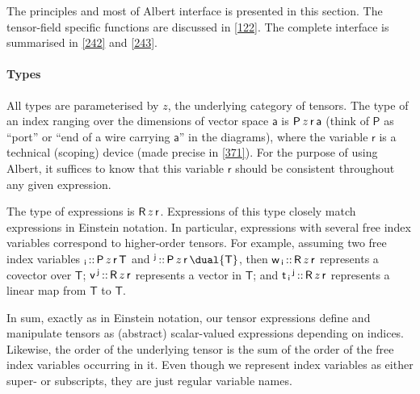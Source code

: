\documentclass[nolinenum]{jfp}
\begin{document}
The principles and most of {\sc{}Albert} interface is presented in this
section. The tensor-field specific functions are discussed in
\cref{122}. The complete interface is summarised in \cref{242} and \cref{243}.

\paragraph*{Types}\hspace{1.0ex}\label{106} All types are parameterised by \(z\), the underlying category of tensors.
The type of an index ranging over the dimensions of vector space
\(\mathsf{a}\) is \(\mathsf{P}\mskip 3.0muz\mskip 3.0mu\mathsf{r}\mskip 3.0mu\mathsf{a}\) (think of \(\mathsf{P}\) as ``port'' or ``end of a wire carrying \(\mathsf{a}\)'' in
the diagrams), where the variable \(\mathsf{r}\) is a technical (scoping) device
(made precise in \cref{371}). For the purpose of using {\sc{}Albert}, it
suffices to know that this variable \(\mathsf{r}\) should be consistent
throughout any given expression.

The type of expressions is \(\mathsf{R}\mskip 3.0muz\mskip 3.0mu\mathsf{r}\). Expressions of this type
closely match expressions in Einstein notation.  In
particular, expressions with several free index variables
correspond to higher-order tensors. For example, assuming two
free index variables
\(_{\mathsf{i}}\mskip 3.0mu\mathnormal{::}\mskip 3.0mu\mathsf{P}\mskip 3.0muz\mskip 3.0mu\mathsf{r}\mskip 3.0mu\mathsf{T}\) and
\(^{\mathsf{j}}\mskip 3.0mu\mathnormal{::}\mskip 3.0mu\mathsf{P}\mskip 3.0muz\mskip 3.0mu\mathsf{r}\mskip 3.0mu\dual{\mathsf{T}}\),
then
\(\mathsf{w}\mskip 3.0mu_{\mathsf{i}}\mskip 3.0mu\mathnormal{::}\mskip 3.0mu\mathsf{R}\mskip 3.0muz\mskip 3.0mu\mathsf{r}\) represents a covector over \(\mathsf{T}\);
\(\mathsf{v}\mskip 3.0mu^{\mathsf{j}}\mskip 3.0mu\mathnormal{::}\mskip 3.0mu\mathsf{R}\mskip 3.0muz\mskip 3.0mu\mathsf{r}\) represents a vector in \(\mathsf{T}\);
and
\(\mathsf{t}\mskip 3.0mu_{\mathsf{i}}\mskip 3.0mu^{\mathsf{j}}\mskip 3.0mu\mathnormal{::}\mskip 3.0mu\mathsf{R}\mskip 3.0muz\mskip 3.0mu\mathsf{r}\) represents a linear map from \(\mathsf{T}\) to \(\mathsf{T}\).

In sum, exactly as in Einstein notation, our tensor expressions define
and manipulate tensors as (abstract) scalar-valued expressions depending on
indices. Likewise, the order of the underlying tensor is the sum
of the order of the free index variables occurring in it.
Even though we represent index variables as either super- or subscripts,
they are just regular variable names.
\end{document}

